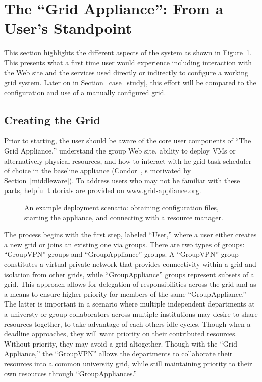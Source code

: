 \documentclass[conference]{IEEEtran}
\begin{document}
\section{The ``Grid Appliance'': From a User's Standpoint}
\label{system}

This section highlights the different aspects of the system as shown in
Figure~\ref{fig:system}.  This presents what a first time user would experience
including interaction with the Web site and the services used directly or
indirectly to configure a working grid system.  Later on in
Section~\ref{case_study}, this effort will be compared to the configuration and
use of a manually configured grid.

\subsection{Creating the Grid}

Prior to starting, the user should be aware of the core user components of
``The Grid Appliance,'' understand the group Web site, ability to deploy VMs or
alternatively physical resources, and how to interact with he grid task
scheduler of choice in the baseline appliance (Condor~\cite{condor0}, s
motivated by Section~\ref{middleware}).  To address users who may not be
familiar with these parts, helpful tutorials are provided on
\url{www.grid-appliance.org}.  

\begin{figure}[ht]
\centering
{}
\caption{An example deployment scenario:  obtaining configuration files,
starting the appliance, and connecting with a resource manager.}
\label{fig:system}
\end{figure}

The process begins with the first step, labeled ``User,'' where a user either
creates a new grid or joins an existing one via groups.  There are two types of
groups: ``GroupVPN'' groups and ``GroupAppliance'' groups. A ``GroupVPN'' group
constitutes a virtual private network that provides connectivity within a grid
and isolation from other grids, while ``GroupAppliance'' groups represent
subsets of a grid.  This approach allows for delegation of responsibilities
across the grid and as a means to ensure higher priority for members of the
same ``GroupAppliance.'' The latter is important in a scenario where multiple
independent departments at a universty or group collaborators across multiple
institutions may desire to share resources together, to take advantage of each
others idle cycles.  Though when a deadline approaches, they will want priority
on their contributed resources.  Without priority, they may avoid a grid
altogether.  Though with the ``Grid Appliance,'' the ``GroupVPN'' allows the
departments to collaborate their resources into a common university grid, while
still maintaining priority to their own resources through ``GroupAppliances.''
\end{document}
